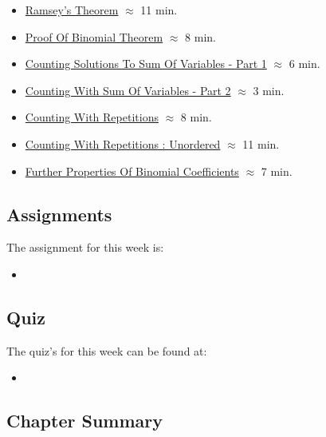 \begin{itemize}
    \item \href{https://applied.cs.colorado.edu/mod/hvp/view.php?id=51805}{Ramsey's Theorem} $\approx$ 11 min.
    \item \href{https://applied.cs.colorado.edu/mod/hvp/view.php?id=51806}{Proof Of Binomial Theorem} $\approx$ 8 min.
    \item \href{https://applied.cs.colorado.edu/mod/hvp/view.php?id=51807}{Counting Solutions To Sum Of Variables - Part 1} $\approx$ 6 min.
    \item \href{https://applied.cs.colorado.edu/mod/hvp/view.php?id=51808}{Counting With Sum Of Variables - Part 2} $\approx$ 3 min.
    \item \href{https://applied.cs.colorado.edu/mod/hvp/view.php?id=51809}{Counting With Repetitions} $\approx$ 8 min.
    \item \href{https://applied.cs.colorado.edu/mod/hvp/view.php?id=51810}{Counting With Repetitions : Unordered} $\approx$ 11 min.
    \item \href{https://applied.cs.colorado.edu/mod/hvp/view.php?id=51811}{Further Properties Of Binomial Coefficients} $\approx$ 7 min.
\end{itemize}

\subsection{Assignments}

The assignment for this week is:

\begin{itemize}
    \item {}
\end{itemize}

\subsection{Quiz}

The quiz's for this week can be found at:

\begin{itemize}
    \item {}
\end{itemize}

\subsection{Chapter Summary}

